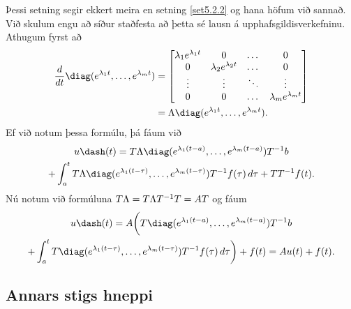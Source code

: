 Þessi setning segir ekkert meira en setning \ref{set5.2.2} og hana höfum
við sannað.  Við skulum engu að síður  staðfesta að þetta sé lausn á
upphafsgildisverkefninu.  Athugum fyrst að
\begin{align*}
\dfrac d{dt}\diag(e^{\lambda_1 t},\dots,e^{\lambda_mt})
&=
\left[\begin{matrix}
\lambda_1e\sp{\lambda_1t}&0&\dots&0\\
0&\lambda_2e\sp{\lambda_2t}&\dots&0\\
\vdots&\vdots&\ddots&\vdots\\
0&0&\dots&\lambda_me^{\lambda_mt}
\end{matrix}\right]\\
&=\Lambda\diag(e^{\lambda_1 t},\dots,e^{\lambda_mt}).
\end{align*}
Ef við notum þessa formúlu, þá fáum við
 \begin{multline*}
u\dash(t)=T\Lambda \diag(e^{\lambda_1(t-a)},\dots,e^{\lambda_m(t-a)})T^{-1}b
\\
+\int_a^t T\Lambda 
\diag(e^{\lambda_1(t-\tau)},\dots,e^{\lambda_m(t-\tau)})T^{-1}f(\tau)\,
d\tau + TT^{-1}f(t).
\end{multline*}
Nú notum við formúluna $T\Lambda =T\Lambda T\sp{-1}T=AT$ og fáum
\begin{multline*}
u\dash(t)
=A\bigg(T\diag(e^{\lambda_1(t-a)},\dots,e^{\lambda_m(t-a)})T^{-1}b \\
+\int_a^t
T\diag(e^{\lambda_1(t-\tau)},\dots,e^{\lambda_m(t-\tau)})T^{-1}f(\tau)\, 
d\tau\bigg)+ f(t)=Au(t)+f(t).
\end{multline*}
 

\subsection*{Annars stigs hneppi}

